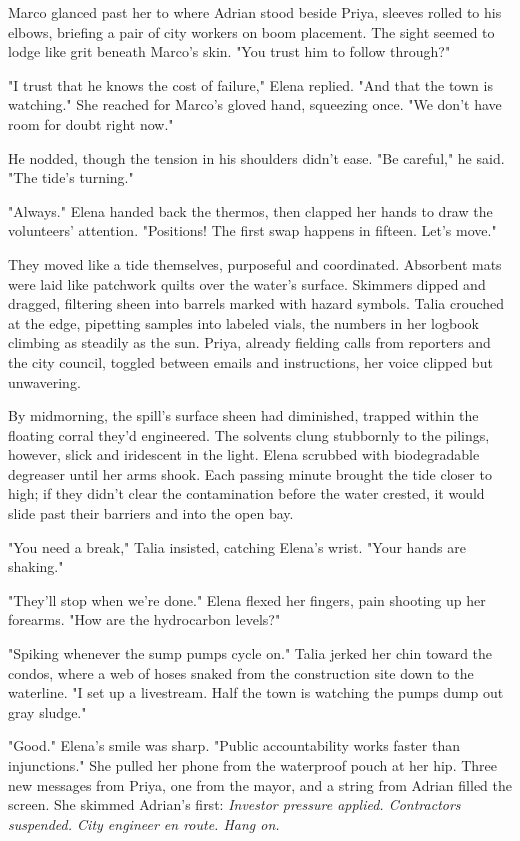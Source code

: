 Marco glanced past her to where Adrian stood beside Priya, sleeves rolled to his elbows, briefing a pair of city workers on boom placement. The sight seemed to lodge like grit beneath Marco's skin. "You trust him to follow through?"

"I trust that he knows the cost of failure," Elena replied. "And that the town is watching." She reached for Marco's gloved hand, squeezing once. "We don't have room for doubt right now."

He nodded, though the tension in his shoulders didn't ease. "Be careful," he said. "The tide's turning."

"Always." Elena handed back the thermos, then clapped her hands to draw the volunteers' attention. "Positions! The first swap happens in fifteen. Let's move."

They moved like a tide themselves, purposeful and coordinated. Absorbent mats were laid like patchwork quilts over the water's surface. Skimmers dipped and dragged, filtering sheen into barrels marked with hazard symbols. Talia crouched at the edge, pipetting samples into labeled vials, the numbers in her logbook climbing as steadily as the sun. Priya, already fielding calls from reporters and the city council, toggled between emails and instructions, her voice clipped but unwavering.

By midmorning, the spill's surface sheen had diminished, trapped within the floating corral they'd engineered. The solvents clung stubbornly to the pilings, however, slick and iridescent in the light. Elena scrubbed with biodegradable degreaser until her arms shook. Each passing minute brought the tide closer to high; if they didn't clear the contamination before the water crested, it would slide past their barriers and into the open bay.

"You need a break," Talia insisted, catching Elena's wrist. "Your hands are shaking."

"They'll stop when we're done." Elena flexed her fingers, pain shooting up her forearms. "How are the hydrocarbon levels?"

"Spiking whenever the sump pumps cycle on." Talia jerked her chin toward the condos, where a web of hoses snaked from the construction site down to the waterline. "I set up a livestream. Half the town is watching the pumps dump out gray sludge."

"Good." Elena's smile was sharp. "Public accountability works faster than injunctions." She pulled her phone from the waterproof pouch at her hip. Three new messages from Priya, one from the mayor, and a string from Adrian filled the screen. She skimmed Adrian's first: \textit{Investor pressure applied. Contractors suspended. City engineer en route. Hang on.}

